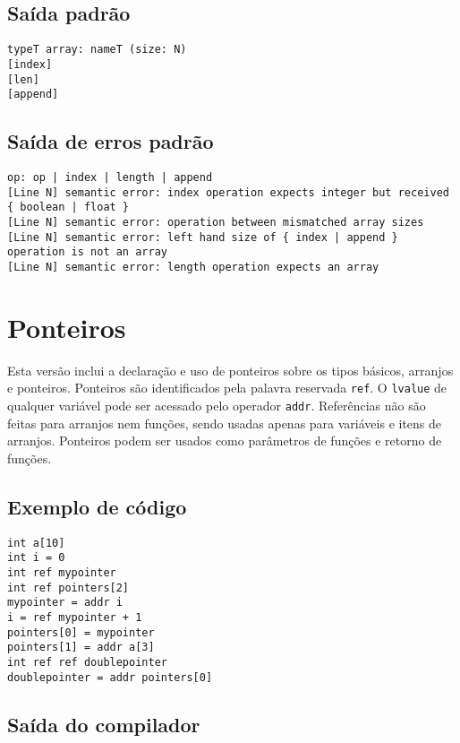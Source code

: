 \documentclass{sftex/sftex}
\begin{document}
\subsection{Saída padrão}

\begin{verbatim}
typeT array: nameT (size: N)
[index]
[len]
[append]
\end{verbatim}

\subsection{Saída de erros padrão}

\begin{verbatim}
op: op | index | length | append
[Line N] semantic error: index operation expects integer but received { boolean | float }
[Line N] semantic error: operation between mismatched array sizes
[Line N] semantic error: left hand size of { index | append } operation is not an array
[Line N] semantic error: length operation expects an array
\end{verbatim}

\section{Ponteiros}

Esta versão inclui a declaração e uso de ponteiros sobre os tipos básicos,
arranjos e ponteiros. Ponteiros são identificados pela palavra reservada
\verb!ref!. O \verb!lvalue! de qualquer variável pode ser acessado pelo
operador \verb!addr!. Referências não são feitas para arranjos nem funções,
sendo usadas apenas para variáveis e itens de arranjos. Ponteiros podem ser
usados como parâmetros de funções e retorno de funções.

\subsection{Exemplo de código}

\begin{verbatim}
int a[10]
int i = 0
int ref mypointer
int ref pointers[2]
mypointer = addr i
i = ref mypointer + 1
pointers[0] = mypointer
pointers[1] = addr a[3]
int ref ref doublepointer
doublepointer = addr pointers[0]
\end{verbatim}

\subsection{Saída do compilador}
\end{document}
